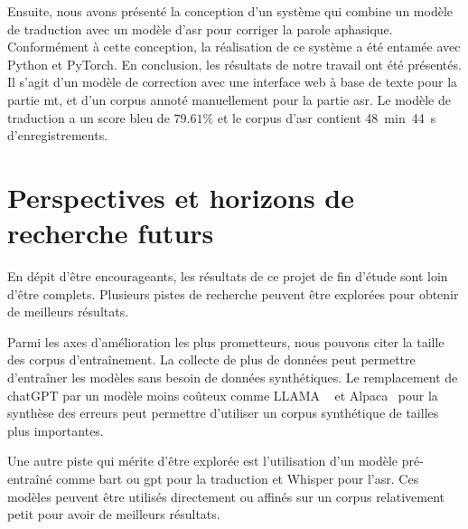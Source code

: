 Ensuite, nous avons présenté la conception d'un système 
qui combine un modèle de traduction avec un modèle d'\gls{asr} pour corriger la parole aphasique.
Conformément à cette conception, la réalisation de ce système a été entamée avec Python et PyTorch.
En conclusion, les résultats de notre travail ont été présentés.
Il s'agit d'un modèle de correction avec une interface web à base de texte pour la partie \gls{mt},
et d'un corpus annoté manuellement pour la partie \gls{asr}.
Le modèle de traduction a un score \gls{bleu} de \(79.61\%\) 
et le corpus d'\gls{asr} contient 48~min~44~s d'enregistrements.

\section*{Perspectives et horizons de recherche futurs}

En dépit d'être encourageants, les résultats de ce projet de fin d'étude sont loin d'être complets.
Plusieurs pistes de recherche peuvent être explorées pour obtenir de meilleurs résultats.

Parmi les axes d'amélioration les plus prometteurs, nous pouvons citer la taille des corpus d'entraînement.
La collecte de plus de données peut permettre d'entraîner les modèles sans besoin de données synthétiques.
Le remplacement de chatGPT par un modèle moins coûteux comme LLAMA%
~\cite{Touvron_Lavril_Izacard_Martinet_Lachaux_Lacroix_Rozière_Goyal_Hambro_Azhar_etal._2023}
et Alpaca~\cite{Zhang_Han_Zhou_Hu_Yan_Lu_Li_Gao_Qiao_2023}
pour la synthèse des erreurs peut permettre d'utiliser un corpus synthétique de tailles plus importantes.

Une autre piste qui mérite d'être explorée est l'utilisation d'un modèle pré-entraîné comme \gls{bart} ou \gls{gpt}
pour la traduction et Whisper pour l'\gls{asr}.
Ces modèles peuvent être utilisés directement 
ou affinés sur un corpus relativement petit pour avoir de meilleurs résultats. 

